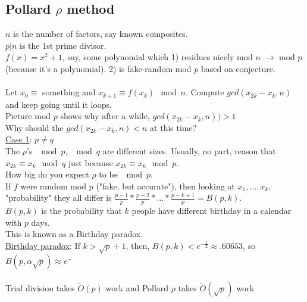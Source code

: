 \documentclass[13pt]{article}
\begin{document}
	\subsection*{Pollard $\rho$ method}
		$n$ is the number of factors, say known composites.\\
		$p | n$ is the 1st prime divisor.\\
		$f(x) = x^2 + 1$, say, some polynomial which 1) residues nicely mod $n$
		$\rightarrow$ mod $p$ (because it's a polynomial). 2) is fake-random
		mod $p$ based on conjecture.\\\\
		Let $x_0 \equiv$ something and $x_{k+1} \equiv f(x_k) \mod n$. Compute
		$gcd(x_{2k} - x_k, n)$ and keep going until it loops.\\
		Picture mod $p$ shows why after a while, $gcd(x_{2k} - x_{k}, n)) > 1$\\
		Why should the $gcd(x_{2k} - x_k, n) < n$ at this time?\\
		\underline{Case 1}: $p \not= q$\\
		The $\rho$'s $\mod p$, $\mod q$ are different sizes. Usually, no
		part, reason that $x_{2k} \equiv x_k \mod q$ just because $x_{2k} \equiv
		x_k \mod p$.\\
		How big do you expect $\rho$ to be $\mod p$.\\
		If $f$ were random mod $p$ ("fake, but accurate"), then looking at
		$x_1, \ldots, x_k$, "probability" they all differ is $\frac{p-1}{p} *
		\frac{p-2}{p} * \ldots * \frac{p-k+1}{p} = B(p, k)$.\\
		$B(p,k)$ is the probability that $k$ people have different birthday
		in a calendar with $p$ days.\\
		This is known as a Birthday paradox. \\
		\underline{Birthday paradox}: If $k > \sqrt{p} + 1$, then, $B(p,k) <
		e^{-\frac{1}{2}} \approx .60653$, so $B(p,\alpha\sqrt{p}) \approx 
		e^{-\frac{}{}}$\\\\
		Trial division takes $\tilde{O}(p)$ work and Pollard $\rho$ takes
		$\tilde{O}(\sqrt{p})$ work\\
\end{document}
